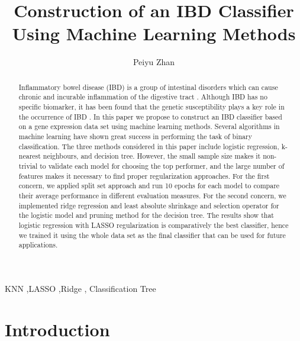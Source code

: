 \documentclass[preprint, 3p,
authoryear]{elsarticle} %
\begin{document}
\begin{frontmatter}

  \title{Construction of an IBD Classifier Using Machine Learning
Methods}
    \author[Some Institute of Technology]{Peiyu Zhan}
  
  
  \begin{abstract}
  Inflammatory bowel disease (IBD) is a group of intestinal disorders
  which can cause chronic and incurable inflammation of the digestive
  tract \citep{CDC}. Although IBD has no specific biomarker, it has been
  found that the genetic susceptibility plays a key role in the
  occurrence of IBD \citep{Loddo}. In this paper we propose to construct
  an IBD classifier based on a gene expression data set using machine
  learning methods. Several algorithms in machine learning have shown
  great success in performing the task of binary classification. The
  three methods considered in this paper include logistic regression,
  k-nearest neighbours, and decision tree. However, the small sample
  size makes it non-trivial to validate each model for choosing the top
  performer, and the large number of features makes it necessary to find
  proper regularization approaches. For the first concern, we applied
  split set approach and run 10 epochs for each model to compare their
  average performance in different evaluation measures. For the second
  concern, we implemented ridge regression and least absolute shrinkage
  and selection operator for the logistic model and pruning method for
  the decision tree. The results show that logistic regression with
  LASSO regularization is comparatively the best classifier, hence we
  trained it using the whole data set as the final classifier that can
  be used for future applications.
  \end{abstract}
    \begin{keyword}
    KNN \sep LASSO \sep Ridge \sep 
    Classification Tree
  \end{keyword}
  
 \end{frontmatter}

\hypertarget{introduction}{%
\section{Introduction}\label{introduction}}
\end{document}
